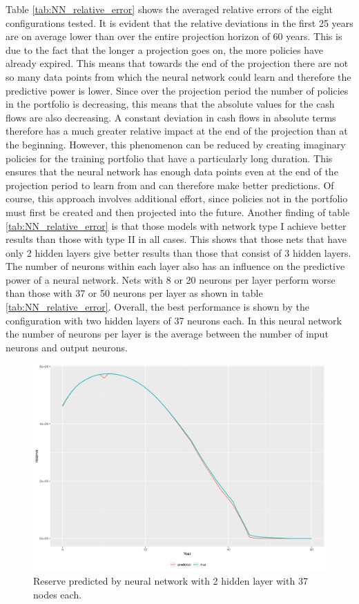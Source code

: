 Table \ref{tab:NN_relative_error} shows the averaged relative errors of the eight configurations tested. It is evident that the relative deviations in the first 25 years are on average lower than over the entire projection horizon of 60 years. This is due to the fact that the longer a projection goes on, the more policies have already expired. This means that towards the end of the projection there are not so many data points from which the neural network could learn and therefore the predictive power is lower. Since over the projection period the number of policies in the portfolio is decreasing, this means that the absolute values for the cash flows are also decreasing. A constant deviation in cash flows in absolute terms therefore has a much greater relative impact at the end of the projection than at the beginning. However, this phenomenon can be reduced by creating imaginary policies for the training portfolio that have a particularly long duration. This ensures that the neural network has enough data points even at the end of the projection period to learn from and can therefore make better predictions. Of course, this approach involves additional effort, since policies not in the portfolio must first be created and then projected into the future. Another finding of table \ref{tab:NN_relative_error} is that those models with network type I achieve better results than those with type II in all cases. This shows that those nets that have only 2 hidden layers give better results than those that consist of 3 hidden layers. The number of neurons within each layer also has an influence on the predictive power of a neural network. Nets with 8 or 20 neurons per layer perform worse than those with 37 or 50 neurons per layer as shown in table \ref{tab:NN_relative_error}. Overall, the best performance is shown by the configuration with two hidden layers of 37 neurons each. In this neural network the number of neurons per layer is the average between the number of input neurons and output neurons.
\begin{figure}
	\centering
	\includegraphics[width=\textwidth]{figures/chapter_NN/result_07}
	\caption{Reserve predicted by neural network with 2 hidden layer with 37 nodes each.}
	\label{fig:nn_reserve}
\end{figure}
